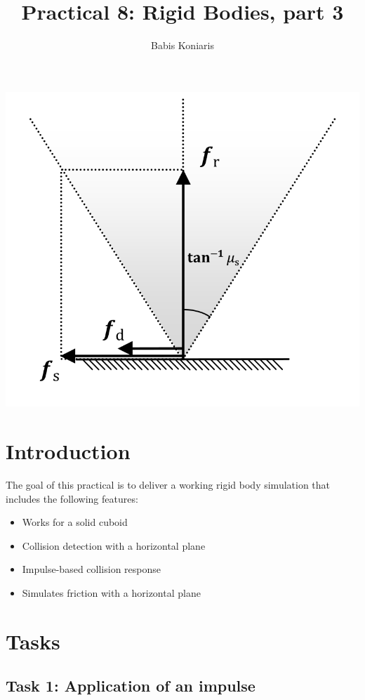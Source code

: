 \documentclass[12pt]{article}
\title{\textbf{Practical 8: Rigid Bodies, part 3 }}
\author{Babis Koniaris}
\date{}
\begin{document}
\maketitle

\begin{center}
\includegraphics[width=\textwidth]{p8-teaser.png}
\end{center}
\pagebreak

\section*{Introduction}

The goal of this practical is to deliver a working rigid body simulation that includes the
following features:

\begin{itemize}
\item Works for a solid cuboid
\item Collision detection with a horizontal plane
\item Impulse-based collision response
\item Simulates friction with a horizontal plane
\end{itemize}

\section*{Tasks}

\subsection*{Task 1: Application of an impulse}
\end{document}
